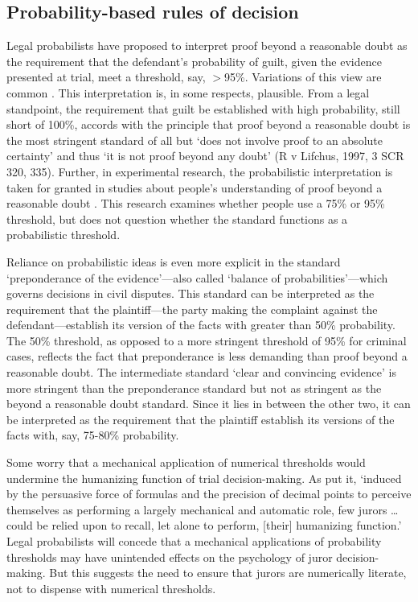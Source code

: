 \documentclass{article}
\begin{document}
\subsection{Probability-based rules of decision}


Legal probabilists have proposed to interpret proof beyond a reasonable 
doubt as
the requirement that the defendant's probability of guilt, given the evidence presented at trial, meet a threshold, say, $>$95\%. Variations of this view are common  \citep[see, for exmaple,][]{Bernoulli1713Ars-conjectandi, Laplace1814,  kaplan1968decision, Dekay1996, kaye79, laudan2006truth}. This interpretation is, in some respects, plausible.
From a legal standpoint, the requirement that guilt be established with high probability, still short of 100\%, accords with the  principle that proof beyond a reasonable doubt is the most stringent standard of all but %
`does not involve proof to an absolute certainty' and thus `it is not proof beyond any doubt' (R v Lifchus, 1997, 3 SCR 320, 335).
Further, in experimental research, the probabilistic interpretation 
is taken for granted in  studies about people's understanding of proof beyond a reasonable doubt \citep{dhamiEtAl2015}. This research examines whether
people use a 75\% or 95\% threshold, but does not question whether the standard functions as a probabilistic threshold.


Reliance on probabilistic ideas is even more explicit in the standard `preponderance of the evidence'---also called `balance of probabilities'---which governs decisions in civil disputes. This standard can be interpreted as the requirement that the plaintiff---the party making the complaint against the defendant---establish its version of the facts with greater than 50\% probability. The 50\% threshold, as opposed to a more stringent threshold of 95\% for criminal cases, reflects the fact that  preponderance is less demanding than proof beyond a reasonable doubt. The intermediate standard `clear and convincing evidence' is more stringent than the preponderance standard but not as stringent as the beyond a reasonable doubt standard. Since it lies in between the other two, it can be interpreted as the requirement that the plaintiff establish its versions of the facts with, say, 75-80\% probability.


Some worry that a mechanical application of numerical thresholds would undermine the humanizing function of trial decision-making. %
As \cite{tribe71} put it, `induced by the persuasive force of formulas and the precision of  decimal  points  to  perceive  themselves  as  performing  a  largely mechanical and automatic  role, few jurors \dots could be relied upon to recall, let alone to perform, [their] humanizing function.' 
Legal probabilists  will concede that a mechanical applications of probability thresholds may have unintended effects on the psychology of juror decision-making. But this suggests the need to ensure that jurors are numerically literate, not to dispense with numerical thresholds. 
\end{document}
